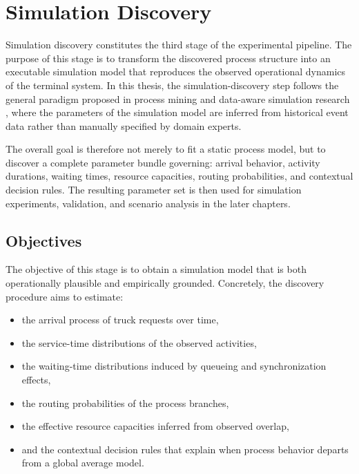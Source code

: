 \section{Simulation Discovery}
\label{sec:simulation_discovery}

Simulation discovery constitutes the third stage of the experimental pipeline.
The purpose of this stage is to transform the discovered process structure into an executable simulation model that reproduces the observed operational dynamics of the terminal system.
In this thesis, the simulation-discovery step follows the general paradigm proposed in process mining and data-aware simulation research \cite{PMRozinat2009,Camargo2020,mannhardt2023stochasticProcessesModelling,lopez2024,Vinci2026prosit},
where the parameters of the simulation model are inferred from historical event data rather than manually specified by domain experts.

The overall goal is therefore not merely to fit a static process model, but to discover a complete parameter bundle governing:
arrival behavior, activity durations, waiting times, resource capacities, routing probabilities, and contextual decision rules.
The resulting parameter set is then used for simulation experiments, validation, and scenario analysis in the later chapters.

\subsection{Objectives}

The objective of this stage is to obtain a simulation model that is both operationally plausible and empirically grounded.
Concretely, the discovery procedure aims to estimate:

\begin{itemize}
    \item the arrival process of truck requests over time,
    \item the service-time distributions of the observed activities,
    \item the waiting-time distributions induced by queueing and synchronization effects,
    \item the routing probabilities of the process branches,
    \item the effective resource capacities inferred from observed overlap,
    \item and the contextual decision rules that explain when process behavior departs from a global average model.
\end{itemize}

